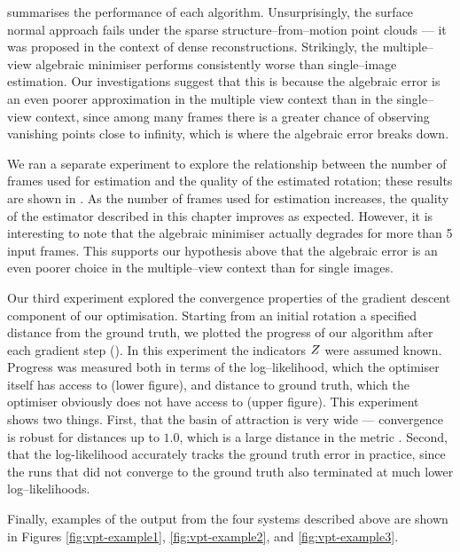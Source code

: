  summarises the performance of each
algorithm. Unsurprisingly, the surface normal approach fails under the
sparse structure--from--motion point clouds --- it was proposed in the
context of dense reconstructions. Strikingly, the multiple--view
algebraic minimiser performs consistently worse than single--image
estimation. Our investigations suggest that this is because the
algebraic error is an even poorer approximation in the multiple view
context than in the single--view context, since among many frames
there is a greater chance of observing vanishing points close to
infinity, which is where the algebraic error breaks down.

We ran a separate experiment to explore the relationship between the
number of frames used for estimation and the quality of the estimated
rotation; these results are shown in . As the
number of frames used for estimation increases, the quality of the
estimator described in this chapter improves as expected. However, it
is interesting to note that the algebraic minimiser actually degrades
for more than 5 input frames. This supports our hypothesis above that
the algebraic error is an even poorer choice in the multiple--view
context than for single images.

Our third experiment explored the convergence properties of the
gradient descent component of our optimisation. Starting from an
initial rotation a specified distance from the ground truth, we
plotted the progress of our algorithm after each gradient step
(). In this experiment the indicators
$\Indicators$ were assumed known. Progress was measured both in terms
of the log--likelihood, which the optimiser itself has access to
(lower figure), and distance to ground truth, which the optimiser
obviously does not have access to (upper figure). This experiment
shows two things. First, that the basin of attraction is very wide ---
convergence is robust for distances up to $1.0$, which is a large
distance in the metric . Second, that the
log-likelihood accurately tracks the ground truth error in practice,
since the runs that did not converge to the ground truth also
terminated at much lower log--likelihoods.

Finally, examples of the output from the four systems described above
are shown in Figures \ref{fig:vpt-example1}, \ref{fig:vpt-example2},
and \ref{fig:vpt-example3}.




